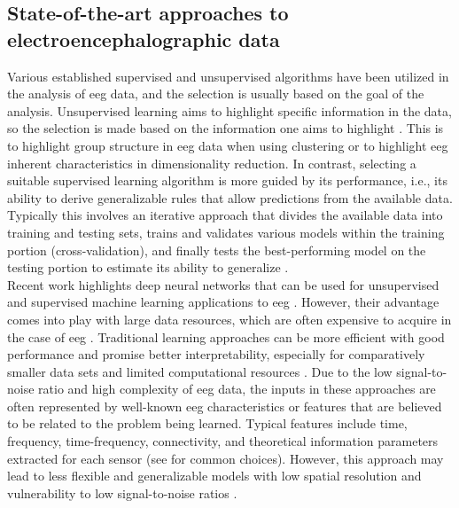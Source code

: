 \subsection{State-of-the-art approaches to electroencephalographic data}
\label{theory:ml:applications_eeg}
Various established supervised and unsupervised algorithms have been utilized in the analysis of \gls{eeg} data, and the selection is usually based on the goal of the analysis. Unsupervised learning aims to highlight specific information in the data, so the selection is made based on the information one aims to highlight \cite{Shalev2014}. This is to highlight group structure in \gls{eeg} data when using clustering or to highlight \gls{eeg} inherent characteristics in dimensionality reduction. In contrast, selecting a suitable supervised learning algorithm is more guided by its performance, i.e., its ability to derive generalizable rules that allow predictions from the available data. Typically this involves an iterative approach that divides the available data into training and testing sets, trains and validates various models within the training portion (cross-validation), and finally tests the best-performing model on the testing portion to estimate its ability to generalize \cite{Hastie2009}.\\
Recent work highlights deep neural networks that can be used for unsupervised and supervised machine learning applications to \gls{eeg} \cite{Roy2019}. However, their advantage comes into play with large data resources, which are often expensive to acquire in the case of \gls{eeg} \cite{Banville2021}. Traditional learning approaches can be more efficient with good performance and promise better interpretability, especially for comparatively smaller data sets and limited computational resources \cite{Gemein2020}. Due to the low signal-to-noise ratio and high complexity of \gls{eeg} data, the inputs in these approaches are often represented by well-known \gls{eeg} characteristics or features that are believed to be related to the problem being learned. Typical features include time, frequency, time-frequency, connectivity, and theoretical information parameters extracted for each sensor (see \citeauthor{Gemein2020} \cite{Gemein2020} for common choices). However, this approach may lead to less flexible and generalizable models with low spatial resolution and vulnerability to low signal-to-noise ratios \cite{Saeidi2021}.\\
